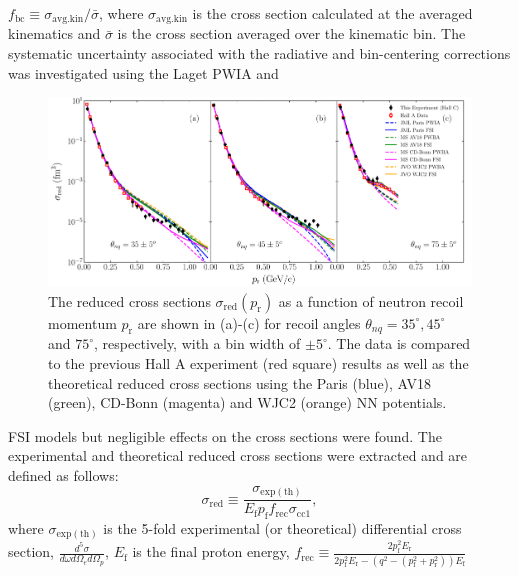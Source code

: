 $f_{\mathrm{bc}} \equiv \sigma_{\mathrm{avg.kin}} / \bar{\sigma}$, where $\sigma_{\mathrm{avg.kin}}$ is the cross section calculated at the averaged kinematics and $\bar{\sigma}$ is the cross section averaged
over the kinematic bin. The systematic uncertainty associated with the radiative and bin-centering corrections was investigated using the Laget PWIA and 
\onecolumngrid
\begin{center}
\begin{figure}
\includegraphics[scale=0.46]{prl_plots/PRL_plot1.pdf}
\caption{The reduced cross sections $\sigma_{\mathrm{red}}(p_{\mathrm{r}})$ as a function of neutron recoil momentum $p_{\mathrm{r}}$ are shown in (a)-(c) for recoil angles $\theta_{nq}=35^{\circ}, 45^{\circ}$ and $75^{\circ}$, respectively,
with a bin width of $\pm 5^{\circ}$. The data is compared to the previous Hall A experiment (red square) results \cite{PhysRevLett.107.262501} as well as the theoretical reduced cross sections using the Paris (blue),
AV18 (green), CD-Bonn (magenta) and WJC2 (orange) NN potentials.}
\label{fig:fig1}
\end{figure}
\end{center}
\twocolumngrid
\noindent FSI models but negligible effects on the cross sections were found. The experimental and theoretical reduced cross sections were extracted and are defined as follows:
\begin{equation}
\sigma_{\mathrm{red}} \equiv \frac{\sigma_{\mathrm{exp(th)}}}{E_{\mathrm{f}}p_{\mathrm{f}}f_{\mathrm{rec}}\sigma_{\mathrm{cc1}}},
\label{eq:1}
\end{equation}
\noindent where $\sigma_{\mathrm{exp(th)}}$ is the 5-fold experimental (or theoretical) differential cross section, $\frac{d^{5}\sigma}{d\omega d\Omega_{e} d\Omega_{p}}$,
$E_{\mathrm{f}}$ is the final proton energy, $f_{\mathrm{rec}}\equiv \frac{2p_{\mathrm{f}}^{2}E_{\mathrm{r}}}{2p_{\mathrm{f}}^{2}E_{\mathrm{r}} - (q^{2} - (p_{\mathrm{f}}^{2} + p_{\mathrm{r}}^{2}))E_{\mathrm{f}}}$
